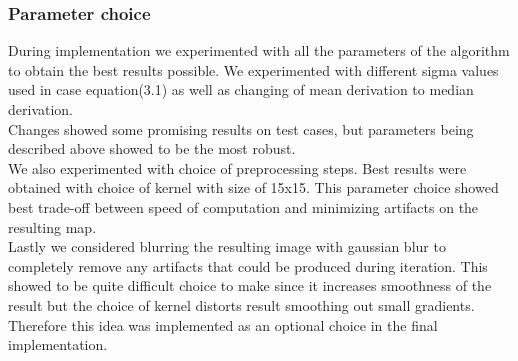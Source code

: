 \documentclass[12pt, a4paper, oneside]{book}
\begin{document}
\subsubsection{Parameter choice}
During implementation we experimented with all the parameters of the algorithm to obtain the best results possible.
We experimented with different sigma values used in case equation(3.1) as well as changing of mean derivation to median derivation.\\
Changes showed some promising results on test cases, but parameters being described above showed to be the most robust.\\
We also experimented with choice of preprocessing steps.
Best results were obtained with choice of kernel with size of 15x15.
This parameter choice showed best trade-off between speed of computation and minimizing artifacts on the resulting map.\\
Lastly we considered blurring the resulting image with gaussian blur to completely remove any artifacts that could be produced during iteration.
This showed to be quite difficult choice to make since it increases smoothness of the result but the choice of kernel distorts result smoothing out small gradients.
Therefore this idea was implemented as an optional choice in the final implementation.\\
\end{document}
